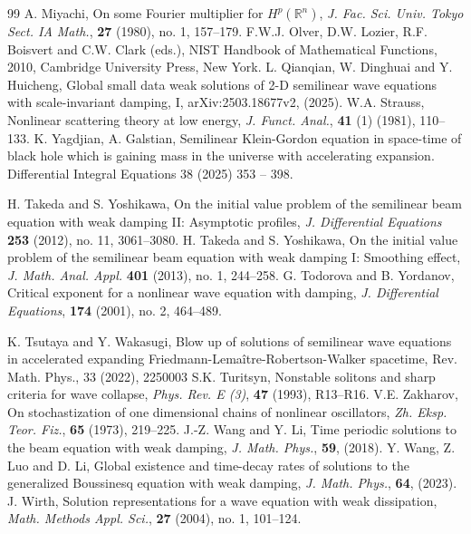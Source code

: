 \documentclass[10pt]{article}
\newcommand{\<}{\langle}
\renewcommand{\>}{\rangle}
\numberwithin{equation}{section}
\begin{document}
\begin{thebibliography}{99}
A. Miyachi, On some Fourier multiplier for $H^p(\mathbb{R}^n)$, \textit{J. Fac. Sci. Univ. Tokyo Sect. IA Math.}, \textbf{27} (1980), no. 1, 157--179.
F.W.J. Olver, D.W. Lozier, R.F. Boisvert and C.W. Clark (eds.), NIST Handbook of Mathematical Functions, 2010, Cambridge University Press, New York.
L. Qianqian, W. Dinghuai and Y. Huicheng,
Global small data weak solutions of 2-D semilinear wave equations with scale-invariant damping, I, arXiv:2503.18677v2, (2025).
W.A. Strauss, Nonlinear scattering theory at low energy, \emph{J. Funct. Anal.}, \textbf{41} (1) (1981), 110--133.
 K. Yagdjian, A. Galstian, Semilinear Klein-Gordon equation in space-time of black hole which is gaining mass in the universe with accelerating expansion. Differential Integral Equations 38 (2025) 353 -- 398.

H. Takeda and S. Yoshikawa, On the initial value problem of the semilinear beam equation with weak damping II: Asymptotic profiles, \textit{J. Differential Equations} \textbf{253} (2012), no. 11, 3061--3080.
H. Takeda and S. Yoshikawa, On the initial value problem of the semilinear beam equation with weak damping I: Smoothing effect, \textit{J. Math. Anal. Appl.} \textbf{401} (2013), no. 1, 244--258.
G. Todorova and B. Yordanov, Critical exponent for a nonlinear wave equation with damping, \textit{J. Differential Equations}, \textbf{174} (2001), no. 2, 464--489.

 K. Tsutaya and Y. Wakasugi, Blow up of solutions of semilinear wave equations in
accelerated expanding Friedmann-Lema\^itre-Robertson-Walker spacetime, Rev. Math.
Phys., 33 (2022), 2250003
S.K. Turitsyn, Nonstable solitons and sharp criteria for wave collapse, \textit{Phys. Rev. E (3)}, \textbf{47} (1993), R13--R16.
V.E. Zakharov, On stochastization of one dimensional chains of nonlinear oscillators, \textit{Zh. Eksp. Teor. Fiz.}, \textbf{65} (1973), 219--225.
J.-Z. Wang and Y. Li, Time periodic solutions to the beam equation with weak damping, \textit{J. Math. Phys.}, \textbf{59}, (2018).
Y. Wang, Z. Luo and D. Li, Global existence and time-decay rates of solutions to the generalized Boussinesq equation with weak damping, \textit{J. Math. Phys.}, \textbf{64}, (2023).
J. Wirth, Solution representations for a wave equation with weak dissipation, \emph{Math. Methods Appl. Sci.}, \textbf{27} (2004), no. 1, 101--124.


\end{thebibliography}
\end{document}
